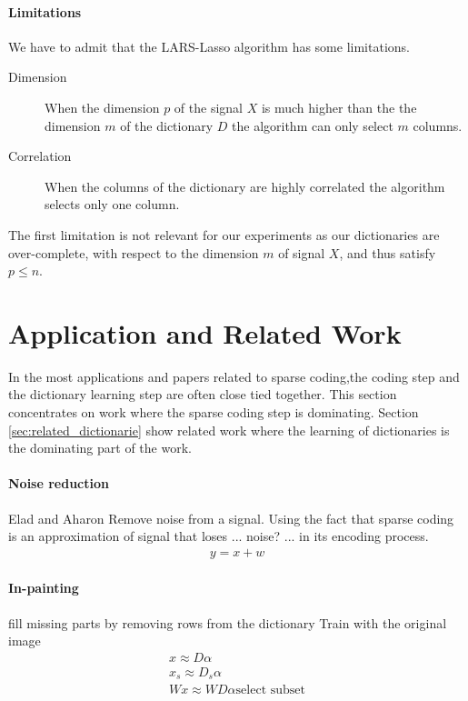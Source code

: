 \paragraph{Limitations}
We have to admit that the LARS-Lasso algorithm has some limitations.
\begin{description}
 \item[Dimension] When the dimension $p$ of the signal $X$ is much higher than
the the dimension $m$ of the dictionary $D$ the algorithm can only select $m$
columns.
  \item[Correlation] When the columns of the dictionary are highly correlated
the algorithm selects only one column.
\end{description}
The first limitation is not relevant for our experiments as our dictionaries
are over-complete, with respect to the dimension $m$ of signal $X$, and thus
satisfy $p\leq n$. 

\section{Application and Related Work}
In the most applications and papers related to sparse coding,the coding
step and the dictionary learning step are often close tied together. This
section concentrates on work where the sparse coding step is dominating. Section
\ref{sec:related_dictionarie} show related work where the learning of
dictionaries is the dominating part of the work.

\paragraph{Noise reduction}
Elad and Aharon\cite{Elad2006}
Remove noise from a signal. 
Using the fact that sparse coding is an approximation of signal that loses ...
noise? ... in its encoding process. 
\begin{align*}
y = x + w
\end{align*}

\paragraph{In-painting}
fill missing parts by removing rows from the dictionary
Train with the original image
\begin{align*}
x \approx D\alpha\\
x_s \approx D_s\alpha\\
Wx \approx WD\alpha\text{select subset}\\
\end{align*}
\cite{mairal08sparse}


